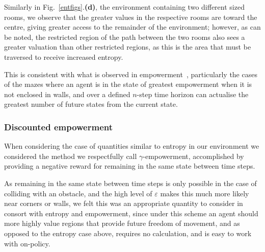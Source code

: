 \documentclass{article}
\begin{document}
Similarly in Fig.~\ref{entfigs}.\textbf{(d)}, the environment containing two different sized rooms, we observe that the greater values in the respective rooms are toward the centre, giving greater access to the remainder of the environment; however, as can be noted, the restricted region of the path between the two rooms also sees a greater valuation than other restricted regions, as this is the area that must be traversed to receive increased entropy.

This is consistent with what is observed in empowerment~\citep{klyubin2005empowerment}, particularly the cases of the mazes where an agent is in the state of greatest empowerment when it is not enclosed in walls, and over a defined $n$-step time horizon can actualise the greatest number of future states from the current state.

\subsubsection{Discounted empowerment\label{gammares}}
When considering the case of quantities similar to entropy in our environment we considered the method we respectfully call $\gamma$-empowerment, accomplished by providing a negative reward for remaining in the same state between time steps.

As remaining in the same state between time steps is only possible in the case of colliding with an obstacle, and the high level of $\varepsilon$ makes this much more likely near corners or walls, we felt this was an appropriate quantity to consider in consort with entropy and empowerment, since under this scheme an agent should more highly value regions that provide future freedom of movement, and as opposed to the entropy case above, requires no calculation, and is easy to work with on-policy.
\end{document}
